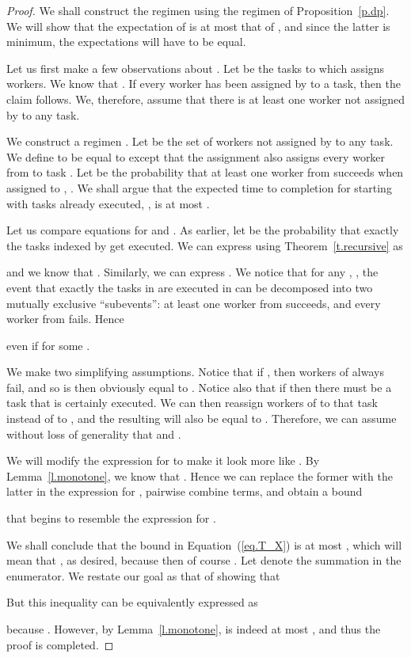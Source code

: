 \documentclass[letterpaper,11pt]{article}
\begin{document}
\begin{proof}
We shall construct the regimen  using the regimen  of Proposition~\ref{p.dp}. We will show that the expectation of  is at most that of , and since the latter is minimum, the expectations will have to be equal. 

Let us first make a few observations about . Let  be the tasks to which  assigns workers. We know that . If every worker has been assigned by  to a task, then the claim follows. We, therefore, assume that there is at least one worker not assigned by  to any task. 

We construct a regimen . Let  be the set of workers not assigned by  to any task. We define  to be equal to  except that the assignment  also assigns every worker from  to task . Let  be the probability that at least one worker from  succeeds when assigned to , . We shall argue that the expected time to completion for  starting with tasks  already executed, , is at most .

Let us compare equations for  and . As earlier, let  be the probability that exactly the tasks indexed by  get executed. We can express  using Theorem~\ref{t.recursive} as

and we know that .
Similarly, we can express . We notice that for any , , the event that exactly the tasks in  are executed in  can be decomposed into two mutually exclusive ``subevents'': at least one worker from  succeeds, and every worker from  fails. Hence

even if  for some .

We make two simplifying assumptions. Notice that if , then workers of  always fail, and so  is then obviously equal to . Notice also that if  then there must be a task that is certainly executed. We can then reassign workers of  to that task instead of to , and the resulting  will also be equal to . Therefore, we can assume without loss of generality that  and .

We will modify the expression for  to make it look more like . By Lemma~\ref{l.monotone}, we know that . Hence we can replace the former with the latter in the expression for , pairwise combine terms, and obtain a bound

that begins to resemble the expression for . 

We shall conclude that the bound in Equation~(\ref{eq.T_X}) is at most , which will mean that , as desired, because then of course . Let  denote the summation in the enumerator. We restate our goal as that of showing that

But this inequality can be equivalently expressed as

because . However, by Lemma~\ref{l.monotone},  is indeed at most , and thus the proof is completed.
\end{proof}
\end{document}
